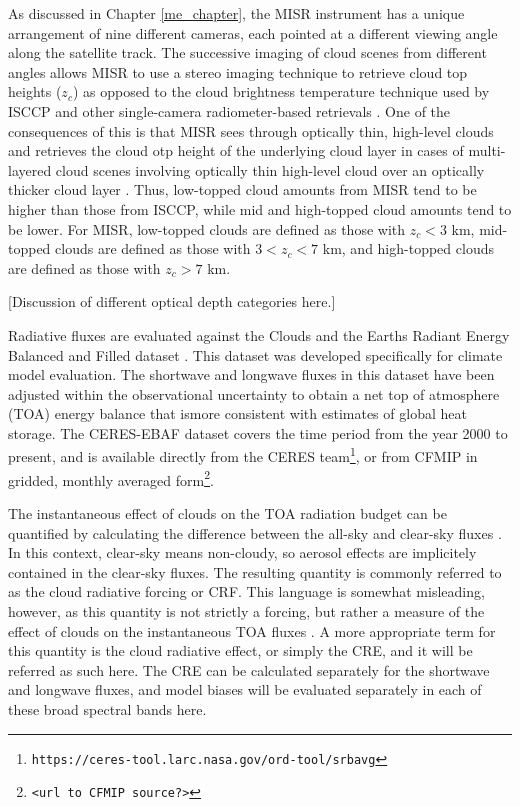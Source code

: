 As discussed in Chapter \ref{me_chapter}, the MISR instrument has a unique arrangement of nine different cameras, each pointed at a different viewing angle along the satellite track. The successive imaging of cloud scenes from different angles allows MISR to use a stereo imaging technique to retrieve cloud top heights ($z_c$) as opposed to the cloud brightness temperature technique used by ISCCP and other single-camera radiometer-based retrievals \citep{moroney_et_al_2002, muller_et_al_2002}. One of the consequences of this is that MISR sees through optically thin, high-level clouds and retrieves the cloud otp height of the underlying cloud layer in cases of multi-layered cloud scenes involving optically thin high-level cloud over an optically thicker cloud layer \citep{marchand_et_al_2010}. Thus, low-topped cloud amounts from MISR tend to be higher than those from ISCCP, while mid and high-topped cloud amounts tend to be lower. For MISR, low-topped clouds are defined as those with $z_c < 3$ km, mid-topped clouds are defined as those with $3 < z_c < 7$ km, and high-topped clouds are defined as those with $z_c > 7$ km.

[Discussion of different optical depth categories here.]

Radiative fluxes are evaluated against the Clouds and the Earths Radiant Energy Balanced and Filled dataset \citep[CERES-EBAF Version 2.6;][]{loeb_et_al_2009}. This dataset was developed specifically for climate model evaluation. The shortwave and longwave fluxes in this dataset have been adjusted within the observational uncertainty to obtain a net top of atmosphere (TOA) energy balance that ismore consistent with estimates of global heat storage. The CERES-EBAF dataset covers the time period from the year 2000 to present, and is available directly from the CERES team\footnote{\tt https://ceres-tool.larc.nasa.gov/ord-tool/srbavg}, or from CFMIP in gridded, monthly averaged form\footnote{\tt <url to CFMIP source?>}.

The instantaneous effect of clouds on the TOA radiation budget can be quantified by calculating the difference between the all-sky and clear-sky fluxes \citep[e.g.,][]{ellis_and_vonderhaar_1976, ramanathan_1987, ramanathan_et_al_1989}. In this context, clear-sky means non-cloudy, so aerosol effects are implicitely contained in the clear-sky fluxes. The resulting quantity is commonly referred to as the cloud radiative forcing or CRF. This language is somewhat misleading, however, as this quantity is not strictly a forcing, but rather a measure of the effect of clouds on the instantaneous TOA fluxes \citep{stephens_2005}. A more appropriate term for this quantity is the cloud radiative effect, or simply the CRE, and it will be referred as such here. The CRE can be calculated separately for the shortwave and longwave fluxes, and model biases will be evaluated separately in each of these broad spectral bands here.

